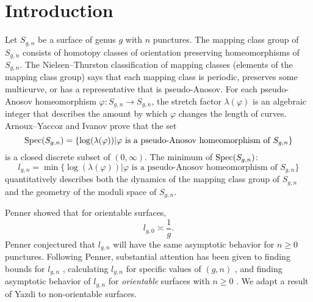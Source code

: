 \section{Introduction}
\label{sec:introduction}

Let $S_{g,n}$ be a surface of genus $g$ with $n$ punctures.  The mapping class group of $S_{g,n}$ consists of homotopy classes of orientation preserving homeomorphisms of $S_{g,n}$.  The Nielsen--Thurston classification of mapping classes (elements of the mapping class group) says that each mapping class is periodic, preserves some multicurve, or has a representative that is pseudo-Anosov.  For each pseudo-Anosov homeomorphism $\varphi:S_{g,n}\rightarrow S_{g,n}$, the stretch factor $\lambda(\varphi)$ is an algebraic integer that describes the amount by which $\varphi$ changes the length of curves.  Arnoux--Yaccoz \cite{AY} and Ivanov \cite{ivanov} prove that the set
$$\operatorname{Spec}(S_{g,n})=\{\log(\lambda(\varphi)) | \varphi \text{ is a pseudo-Anosov homeomorphism of }S_{g,n}\}$$ is a closed discrete subset of $(0,\infty)$. The minimum of $\operatorname{Spec}(S_{g,n})$:
$$l_{g,n}=\min\{\log(\lambda(\varphi)) | \varphi \text{ is a pseudo-Anosov homeomorphism of }S_{g,n}\}$$ quantitatively describes both the dynamics of the mapping class group of $S_{g,n}$ and the geometry of the moduli space of $S_{g,n}$.

Penner \cite{penner1991bounds} showed that for orientable surfaces, $$l_{g,0}\asymp \frac{1}{g}.$$ %
  Penner conjectured that $l_{g,n}$ will have the same asymptotic behavior for  $n\geq0$ punctures.  Following Penner, substantial attention has been given to finding bounds for $l_{g,n}$ \cite{AD,bauer,hironaka,HK,HK20,KT,Loving,minakawa}, calculating $l_{g,n}$ for specific values of $(g,n)$ \cite{CH,HS,LT,SKL}, and finding asymptotic behavior of $l_{g,n}$ for {\it orientable} surfaces with $n\geq 0$ \cite{KT,tsai2009asymptotic,valdivia,yazdi2018pseudo}.  We adapt a result of Yazdi \cite{yazdi2018pseudo} to non-orientable surfaces. %


